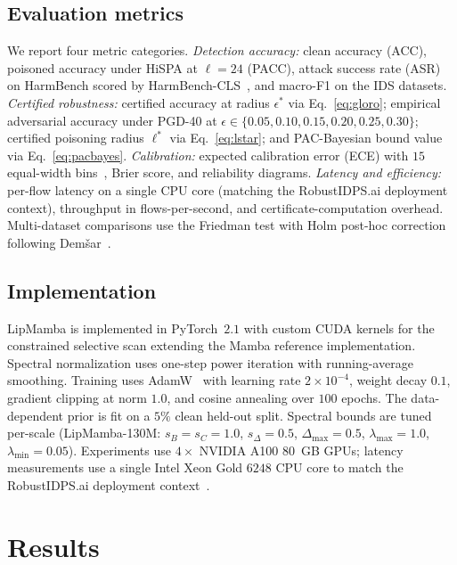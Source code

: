 \documentclass[journal,a4paper,10pt]{IEEEtran}
\theoremstyle{definition}
\theoremstyle{remark}
\newcommand{\modelname}{LipMamba}
\begin{document}
\subsection{Evaluation metrics}

We report four metric categories. \emph{Detection accuracy:} clean accuracy (ACC), poisoned accuracy under HiSPA at $\ell = 24$ (PACC), attack success rate (ASR) on HarmBench scored by HarmBench-CLS~\cite{mazeika2024harmbench}, and macro-F1 on the IDS datasets. \emph{Certified robustness:} certified accuracy at radius $\epsilon^*$ via Eq.~\eqref{eq:gloro}; empirical adversarial accuracy under PGD-40 at $\epsilon \in \{0.05, 0.10, 0.15, 0.20, 0.25, 0.30\}$; certified poisoning radius $\ell^*$ via Eq.~\eqref{eq:lstar}; and PAC-Bayesian bound value via Eq.~\eqref{eq:pacbayes}. \emph{Calibration:} expected calibration error (ECE) with $15$ equal-width bins~\cite{guo2017calibration}, Brier score, and reliability diagrams. \emph{Latency and efficiency:} per-flow latency on a single CPU core (matching the RobustIDPS.ai deployment context), throughput in flows-per-second, and certificate-computation overhead. Multi-dataset comparisons use the Friedman test with Holm post-hoc correction following Demšar~\cite{demsar2006statistical}.

\subsection{Implementation}

\modelname{} is implemented in PyTorch~$2.1$ with custom CUDA kernels for the constrained selective scan extending the Mamba reference implementation. Spectral normalization uses one-step power iteration with running-average smoothing. Training uses AdamW~\cite{loshchilov2019adamw} with learning rate $2 \times 10^{-4}$, weight decay $0.1$, gradient clipping at norm $1.0$, and cosine annealing over $100$ epochs. The data-dependent prior is fit on a $5\%$ clean held-out split. Spectral bounds are tuned per-scale (LipMamba-130M: $s_B = s_C = 1.0$, $s_\Delta = 0.5$, $\Delta_{\max} = 0.5$, $\lambda_{\max} = 1.0$, $\lambda_{\min} = 0.05$). Experiments use $4 \times$ NVIDIA A100 80~GB GPUs; latency measurements use a single Intel Xeon Gold $6248$ CPU core to match the RobustIDPS.ai deployment context~\cite{anaedevha2026robustidps}.


\section{Results}
\label{sec:results}
\end{document}
